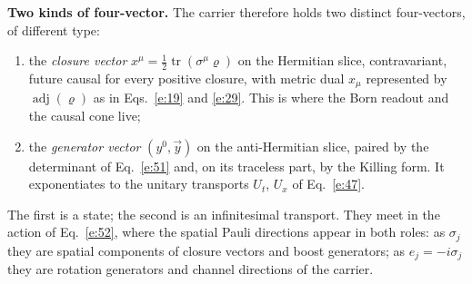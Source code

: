 \documentclass[10pt]{article}
\newcommand{\tr}{\operatorname{tr}}
\newcommand{\adj}{\operatorname{adj}}
\begin{document}
\smallskip
\noindent\textbf{Two kinds of four-vector.} The carrier therefore holds two distinct four-vectors, of different type:
\begin{enumerate}\itemsep0pt
\item the \emph{closure vector} $x^\mu=\frac12\tr(\sigma^\mu\varrho)$ on the Hermitian slice, contravariant, future causal for every positive closure, with metric dual $x_\mu$ represented by $\adj(\varrho)$ as in Eqs.~\eqref{e:19} and \eqref{e:29}. This is where the Born readout and the causal cone live;
\item the \emph{generator vector} $(y^0,\vec y)$ on the anti-Hermitian slice, paired by the determinant of Eq.~\eqref{e:51} and, on its traceless part, by the Killing form. It exponentiates to the unitary transports $U_t$, $U_x$ of Eq.~\eqref{e:47}.
\end{enumerate}
The first is a state; the second is an infinitesimal transport. They meet in the action of Eq.~\eqref{e:52}, where the spatial Pauli directions appear in both roles: as $\sigma_j$ they are spatial components of closure vectors and boost generators; as $e_j=-i\sigma_j$ they are rotation generators and channel directions of the carrier.
\end{document}
